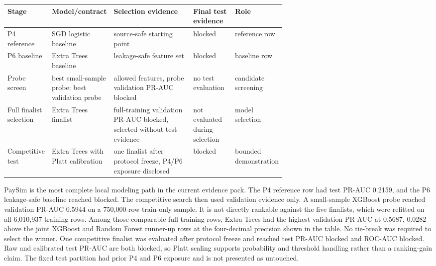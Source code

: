 \documentclass[11pt]{article}
\begin{document}
\begin{center}
\begin{minipage}{\linewidth}
\scriptsize
\setlength{\tabcolsep}{3pt}
\renewcommand{\arraystretch}{1.16}
\begin{tabularx}{\linewidth}{@{}>{\raggedright\arraybackslash}p{0.12\linewidth} >{\raggedright\arraybackslash}p{0.20\linewidth} >{\raggedright\arraybackslash}X >{\raggedright\arraybackslash}p{0.15\linewidth} >{\raggedright\arraybackslash}p{0.18\linewidth}@{}}
\toprule
Stage & Model/contract & Selection evidence & Final test evidence & Role \\
\midrule
P4 reference & SGD logistic baseline & source-safe starting point & blocked & reference row \\
P6 baseline & Extra Trees baseline & leakage-safe feature set & blocked & baseline row \\
Probe screen & best small-sample probe: best validation probe & 0 allowed features, probe validation PR-AUC blocked & no test evaluation & candidate screening \\
Full finalist selection & Extra Trees finalist & full-training validation PR-AUC blocked, selected without test evidence & not evaluated during selection & model selection \\
Competitive test & Extra Trees with Platt calibration & one finalist after protocol freeze, P4/P6 exposure disclosed & blocked & bounded demonstration \\
\bottomrule
\end{tabularx}
\end{minipage}
\end{center}


PaySim is the most complete local modeling path in the current evidence pack. The P4 reference row had test PR-AUC 0.2159, and the P6 leakage-safe baseline reached blocked. The competitive search then used validation evidence only. A small-sample XGBoost probe reached validation PR-AUC 0.5944 on a 750,000-row train-only sample. It is not directly rankable against the five finalists, which were refitted on all 6,010,937 training rows. Among those comparable full-training rows, Extra Trees had the highest validation PR-AUC at 0.5687, 0.0282 above the joint XGBoost and Random Forest runner-up rows at the four-decimal precision shown in the table. No tie-break was required to select the winner. One competitive finalist was evaluated after protocol freeze and reached test PR-AUC blocked and ROC-AUC blocked. Raw and calibrated test PR-AUC are both blocked, so Platt scaling supports probability and threshold handling rather than a ranking-gain claim. The fixed test partition had prior P4 and P6 exposure and is not presented as untouched.
\end{document}
